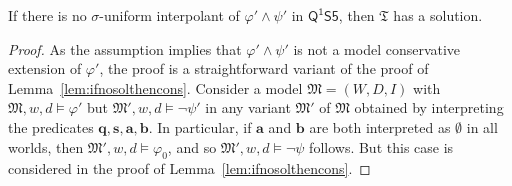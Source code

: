 \documentclass{lmcs} %
\theoremstyle{plain}\newtheorem{satz}[thm]{Satz} %
\newcommand{\tiling}{\mathfrak T}
\newcommand{\ssvar}{\fform{s}}
\newcommand{\FOMS}{\ensuremath{\mathsf{Q^1S5}}}
\newcommand{\fform}[1]{\boldsymbol{#1}}
\newcommand{\qvar}{\fform{q}}
\newcommand{\avar}{\fform{a}}
\newcommand{\bvar}{\fform{b}}
\begin{document}
		\begin{lem}
			If there is no $\sigma$-uniform interpolant of $\varphi'\land\psi'$ in $\FOMS$, then $\tiling$ has a solution.
		\end{lem}
		\begin{proof}
			As the assumption implies that $\varphi'\land\psi'$ is not a model conservative extension of $\varphi'$,
			the proof is a straightforward variant of the proof of Lemma~\ref{lem:ifnosolthencons}.
			Consider a model $\mathfrak{M}=(W,D,I)$ with $\mathfrak{M},w,d\models \varphi'$ but 
			$\mathfrak{M}',w,d\models \neg\psi'$
			in any variant $\mathfrak M'$ of $\mathfrak{M}$ obtained by interpreting the predicates $\qvar,\ssvar,\avar,\bvar$. In particular, if $\avar$ and $\bvar$ are both interpreted as $\emptyset$ in all worlds, then 
			$\mathfrak{M}',w,d\models \varphi_0$, and so  
			$\mathfrak{M}',w,d\models \neg\psi$ follows.	 
			But this case is considered in the proof of Lemma~\ref{lem:ifnosolthencons}. 
		\end{proof}
		
\end{document}
